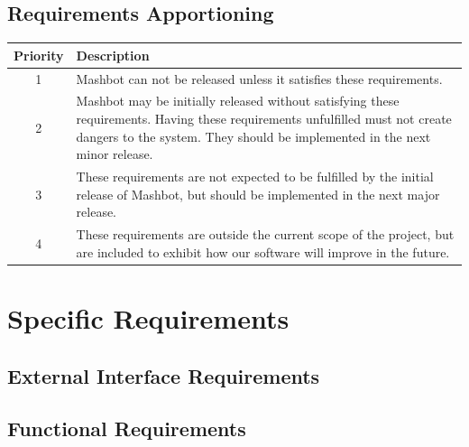 \documentclass{report}
\begin{document}
	\subsection{Requirements Apportioning} %
        \begin{tabular}{|c|p{4in}|}
          \hline
          \textbf{Priority} & \textbf{Description} \\
          \hline \hline
          1 & Mashbot can not be released unless it satisfies these
              requirements. \\
          \hline
          2 & Mashbot may be initially released without satisfying these
              requirements. Having these requirements unfulfilled must
              not create dangers to the system. They should be implemented in the next
              minor release. \\
          \hline
          3 & These requirements are not expected to be fulfilled by
              the initial release of Mashbot, but should be
              implemented in the next major release. \\
          \hline
          4 & These requirements are outside the current scope of the
              project, but are included to exhibit how our software
              will improve in the future. \\
          \hline
        \end{tabular}

\section{Specific Requirements}
	\subsection{External Interface Requirements}
	\subsection{Functional Requirements}
\end{document}
